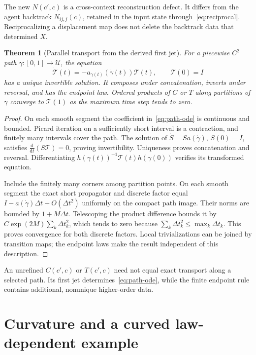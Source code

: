 \documentclass[11pt]{article}
\newtheorem{theorem}{Theorem}
\newcommand{\dd}{\mathrm d}
\begin{document}
The new $N(c',c)$ is a cross-context reconstruction defect. It differs from the agent backtrack $N_{ij,j}(c)$, retained in the input state through~\eqref{eq:reciprocal}. Reciprocalizing a displacement map does not delete the backtrack data that determined $X$.

\begin{theorem}[Parallel transport from the derived first jet]
For a piecewise $C^2$ path $\gamma:[0,1]\to\mathcal U$, the equation
\begin{equation}
 \dot{\mathcal T}(t)=-a_{\gamma(t)}(\dot\gamma(t))\mathcal T(t),\qquad
 \mathcal T(0)=I
 \label{eq:path-ode}
\end{equation}
has a unique invertible solution. It composes under concatenation, inverts under reversal, and has the endpoint law. Ordered products of $C$ or $T$ along partitions of $\gamma$ converge to $\mathcal T(1)$ as the maximum time step tends to zero.
\end{theorem}
\begin{proof}
On each smooth segment the coefficient in~\eqref{eq:path-ode} is continuous and bounded. Picard iteration on a sufficiently short interval is a contraction, and finitely many intervals cover the path. The solution of $\dot S=Sa(\dot\gamma)$, $S(0)=I$, satisfies $\frac{\dd}{\dd t}(S\mathcal T)=0$, proving invertibility. Uniqueness proves concatenation and reversal. Differentiating $h(\gamma(t))^{-1}\mathcal T(t)h(\gamma(0))$ verifies its transformed equation.

Include the finitely many corners among partition points. On each smooth segment the exact short propagator and discrete factor equal $I-a(\dot\gamma)\Delta t+O(\Delta t^2)$ uniformly on the compact path image. Their norms are bounded by $1+M\Delta t$. Telescoping the product difference bounds it by $C\exp(2M)\sum_k\Delta t_k^2$, which tends to zero because $\sum_k\Delta t_k^2\leq\max_k\Delta t_k$. This proves convergence for both discrete factors. Local trivializations can be joined by transition maps; the endpoint laws make the result independent of this description.
\end{proof}

An unrefined $C(c',c)$ or $T(c',c)$ need not equal exact transport along a selected path. Its first jet determines~\eqref{eq:path-ode}, while the finite endpoint rule contains additional, nonunique higher-order data.

\section{Curvature and a curved law-dependent example}
\label{sec:curvature}
\end{document}
